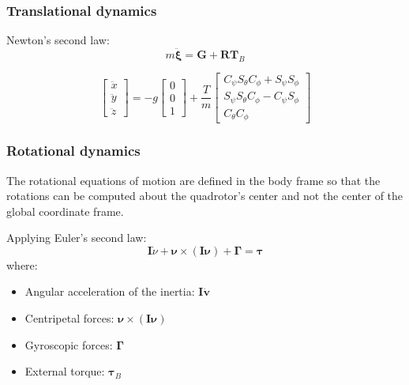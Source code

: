 \subsubsection{Translational dynamics}

Newton's second law: 
$$m \ddot{\boldsymbol{\xi}}=\boldsymbol{G}+\boldsymbol{R} \boldsymbol{T}_{B}$$

$$\left[ \begin{array}{c}{\ddot{x}} \\ {\ddot{y}} \\ {\ddot{z}}\end{array}\right]=-g \left[ \begin{array}{l}{0} \\ {0} \\ {1}\end{array}\right]+\frac{T}{m} \left[ \begin{array}{c}{C_{\psi} S_{\theta} C_{\phi}+S_{\psi} S_{\phi}} \\ {S_{\psi} S_{\theta} C_{\phi}-C_{\psi} S_{\phi}} \\ {C_{\theta} C_{\phi}}\end{array}\right]$$

\subsubsection{Rotational dynamics}
The rotational equations of motion are defined in the body frame so that the rotations can be computed about the quadrotor’s center and not the center of the global coordinate frame.

Applying Euler's second law:
$$\boldsymbol{I} \dot{\nu}+\boldsymbol{\nu} \times(\boldsymbol{I} \boldsymbol{\nu})+\mathbf{\Gamma}=\boldsymbol{\tau}$$
where:
\begin{itemize}
  \item Angular acceleration of the inertia: $\boldsymbol{I\dot{v}}$
  \item Centripetal forces: $\boldsymbol{\nu}\times(\boldsymbol{I \nu})$
  \item Gyroscopic forces: $\boldsymbol{\Gamma}$
  \item External torque: $\boldsymbol{\tau}_B$
\end{itemize}

